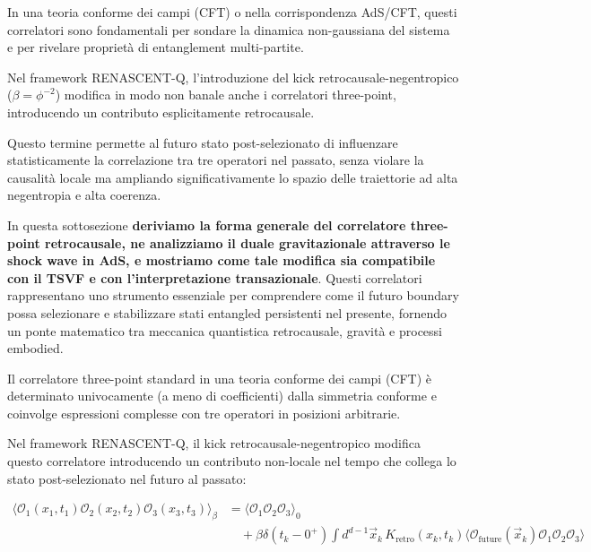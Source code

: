\documentclass[11pt,a4paper]{article}
\theoremstyle{plain}
\theoremstyle{definition}
\begin{document}
In una teoria conforme dei campi (CFT) o nella corrispondenza AdS/CFT, questi correlatori sono fondamentali per sondare la dinamica non-gaussiana del sistema e per rivelare proprietà di entanglement multi-partite.


\vspace{0.3cm}

Nel framework RENASCENT-Q, l’introduzione del kick retrocausale-negentropico ($\beta = \phi^{-2}$) modifica in modo non banale anche i correlatori three-point, introducendo un contributo esplicitamente retrocausale. 


\vspace{0.2cm}



Questo termine permette al futuro stato post-selezionato di influenzare statisticamente la correlazione tra tre operatori nel passato, senza violare la causalità locale ma ampliando significativamente lo spazio delle traiettorie ad alta negentropia e alta coerenza.


\vspace{0.4cm}

In questa sottosezione \textbf{deriviamo la forma generale del correlatore three-point retrocausale, ne analizziamo il duale gravitazionale attraverso le shock wave in AdS, e mostriamo come tale modifica sia compatibile con il TSVF e con l’interpretazione transazionale}. Questi correlatori rappresentano uno strumento essenziale per comprendere come il futuro boundary possa selezionare e stabilizzare stati entangled persistenti nel presente, fornendo un ponte matematico tra meccanica quantistica retrocausale, gravità e processi embodied.


\vspace{0.4cm}

Il correlatore three-point standard in una teoria conforme dei campi (CFT) è determinato univocamente (a meno di coefficienti) dalla simmetria conforme e coinvolge espressioni complesse con tre operatori in posizioni arbitrarie. 


\vspace{0.4cm}



Nel framework RENASCENT-Q, il kick retrocausale-negentropico modifica questo correlatore introducendo un contributo non-locale nel tempo che collega lo stato post-selezionato nel futuro al passato:

\begin{equation}
\begin{aligned}
\langle \mathcal{O}_1(x_1,t_1) \mathcal{O}_2(x_2,t_2) \mathcal{O}_3(x_3,t_3) \rangle_{\beta} 
&= \langle \mathcal{O}_1 \mathcal{O}_2 \mathcal{O}_3 \rangle_0 \\
&\quad + \beta \delta(t_k-0^+) \int d^{d-1}\vec{x}_k \, K_{\text{retro}}(x_k,t_k) 
\langle \mathcal{O}_{\text{future}}(\vec{x}_k) \mathcal{O}_1 \mathcal{O}_2 \mathcal{O}_3 \rangle
\end{aligned}
\label{eq:three_point_retro}
\end{equation}
\end{document}
